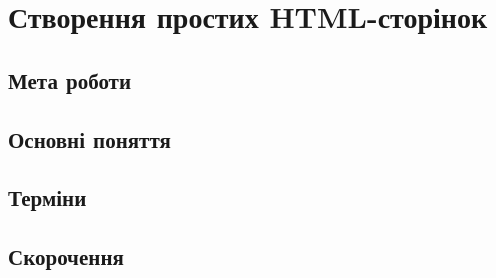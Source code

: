 \chapter{Створення простих HTML-сторінок}
\nopagebreak[4]
\section*{Мета роботи}

\nopagebreak[4]
\section{Основні поняття}
\nopagebreak[4]



\pagebreak[3]

\section{Терміни}
\nopagebreak[4]



\pagebreak[3]

\section{Скорочення}
\nopagebreak[4]



\pagebreak[3]
